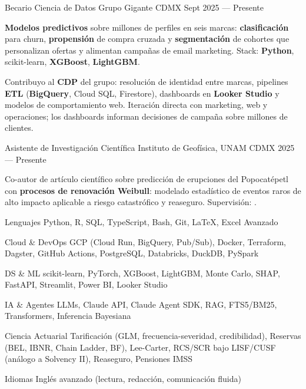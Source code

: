 \documentclass[10pt, letterpaper]{awesome-cv}
\begin{document}
\begin{cventries}

  \cventry
    {Becario Ciencia de Datos}
    {Grupo Gigante}
    {CDMX}
    {Sept 2025 — Presente}
    {
      \begin{cvitems}
        \item {\textbf{Modelos predictivos} sobre millones de perfiles en seis marcas: \textbf{clasificación} para churn, \textbf{propensión} de compra cruzada y \textbf{segmentación} de cohortes que personalizan ofertas y alimentan campañas de email marketing. Stack: \textbf{Python}, scikit-learn, \textbf{XGBoost}, \textbf{LightGBM}.}
        \item {Contribuyo al \textbf{CDP} del grupo: resolución de identidad entre marcas, pipelines \textbf{ETL} (\textbf{BigQuery}, Cloud SQL, Firestore), dashboards en \textbf{Looker Studio} y modelos de comportamiento web. Iteración directa con marketing, web y operaciones; los dashboards informan decisiones de campaña sobre millones de clientes.}
      \end{cvitems}
    }

  \cventry
    {Asistente de Investigación Científica }
    {Instituto de Geofísica, UNAM}
    {CDMX}
    {2025 — Presente}
    {
      \begin{cvitems}
        \item {Co-autor de artículo científico sobre predicción de erupciones del Popocatépetl con \textbf{procesos de renovación Weibull}: modelado estadístico de eventos raros de alto impacto aplicable a riesgo catastrófico y reaseguro. Supervisión: .}
      \end{cvitems}
    }

\end{cventries}


\begin{cvskills}
  \cvskill
    {Lenguajes}
    {Python, R, SQL, TypeScript, Bash, Git, \LaTeX, Excel Avanzado}

  \cvskill
    {Cloud \& DevOps}
    {GCP (Cloud Run, BigQuery, Pub/Sub), Docker, Terraform, Dagster, GitHub Actions, PostgreSQL, Databricks, DuckDB, PySpark}

  \cvskill
    {DS \& ML}
    {scikit-learn, PyTorch, XGBoost, LightGBM, Monte Carlo, SHAP, FastAPI, Streamlit, Power BI, Looker Studio}

  \cvskill
    {IA \& Agentes}
    {LLMs, Claude API, Claude Agent SDK, RAG, FTS5/BM25, Transformers, Inferencia Bayesiana}

  \cvskill
    {Ciencia Actuarial}
    {Tarificación (GLM, frecuencia-severidad, credibilidad), Reservas (BEL, IBNR, Chain Ladder, BF), Lee-Carter, RCS/SCR bajo LISF/CUSF (análogo a Solvency II), Reaseguro, Pensiones IMSS}

  \cvskill
    {Idiomas}
    {Inglés avanzado (lectura, redacción, comunicación fluida)}
\end{cvskills}
\end{document}

